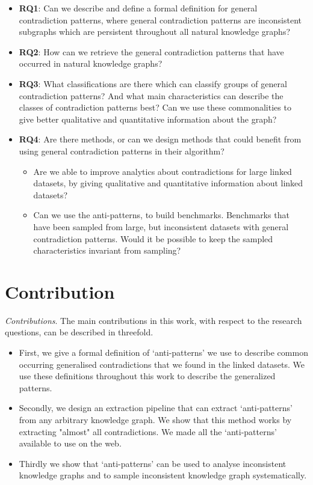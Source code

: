 \documentclass[11pt,letterpaper ,oneside ]{book}
\begin{document}
	\begin{itemize}
		\item \textbf{RQ1}: Can we describe and define a formal definition for general contradiction patterns, where general contradiction patterns are inconsistent subgraphs which are persistent throughout all natural knowledge graphs?
		\item \textbf{RQ2}: How can we retrieve the general contradiction patterns that have occurred in natural knowledge graphs? 
		\item \textbf{RQ3}: What classifications are there which can classify groups of general contradiction patterns? And what main characteristics can describe the classes of contradiction patterns best? Can we use these commonalities to give better qualitative and quantitative information about the graph?
		\item \textbf{RQ4}: Are there methods, or can we design methods that could benefit from using general contradiction patterns in their algorithm? 
		\begin{itemize}
			\item Are we able to improve analytics about contradictions for large linked datasets, by giving qualitative and quantitative information about linked datasets?
			\item Can we use the anti-patterns, to build benchmarks. Benchmarks that have been sampled from large, but inconsistent datasets with general contradiction patterns. Would it be possible to keep the sampled characteristics invariant from sampling?
		\end{itemize}
	\end{itemize}
	
	\section{Contribution}
	\textit{Contributions}. 
	The main contributions in this work, with respect to the research questions, can be described in threefold.
	\begin{itemize}
		\item First, we give a formal definition of `anti-patterns' we use to describe common occurring generalised contradictions that we found in the linked datasets. We use these definitions throughout this work to describe the generalized patterns.
		\item Secondly, we design an extraction pipeline that can extract `anti-patterns' from any arbitrary knowledge graph. We show that this method works by extracting "almost" all contradictions. We made all the `anti-patterns' available to use on the web.
		\item Thirdly we show that `anti-patterns' can be used to analyse inconsistent knowledge graphs and to sample inconsistent knowledge graph systematically.
	\end{itemize}
	
\end{document}
